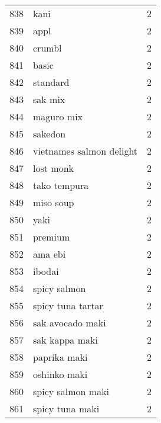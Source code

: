 \begin{tabular}{llr}
838  &                                               kani &      2 \\
839  &                                               appl &      2 \\
840  &                                             crumbl &      2 \\
841  &                                              basic &      2 \\
842  &                                           standard &      2 \\
843  &                                            sak mix &      2 \\
844  &                                         maguro mix &      2 \\
845  &                                            sakedon &      2 \\
846  &                           vietnames salmon delight &      2 \\
847  &                                          lost monk &      2 \\
848  &                                       tako tempura &      2 \\
849  &                                          miso soup &      2 \\
850  &                                               yaki &      2 \\
851  &                                            premium &      2 \\
852  &                                            ama ebi &      2 \\
853  &                                             ibodai &      2 \\
854  &                                       spicy salmon &      2 \\
855  &                                  spicy tuna tartar &      2 \\
856  &                                   sak avocado maki &      2 \\
857  &                                     sak kappa maki &      2 \\
858  &                                       paprika maki &      2 \\
859  &                                       oshinko maki &      2 \\
860  &                                  spicy salmon maki &      2 \\
861  &                                    spicy tuna maki &      2 \\

\end{tabular}
